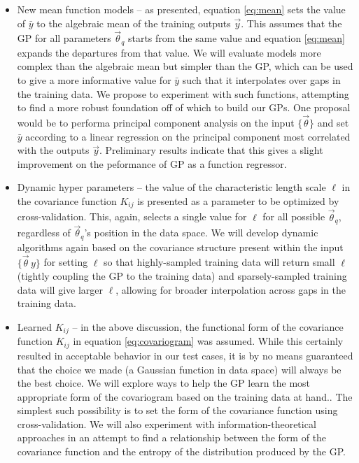 \documentclass[useAMS,usenatbib,tightenlines,11pt,preprint]{aastex}
\begin{document}
\begin{itemize}
\item New mean function models -- as presented,
equation \ref{eq:mean} sets the value of $\bar{y}$ to the algebraic mean of the
training outputs $\vec{y}$.  This assumes that the GP for all 
parameters $\vec{\theta}_q$
starts from the same value and equation \ref{eq:mean} expands the
departures from that value.  
We will evaluate models more complex than the algebraic
mean but simpler than the GP, which can be used to give a more informative value
for $\bar{y}$ such that it interpolates over gaps in the training data.  We propose
to experiment with such functions, attempting to find a more robust foundation off
of which to build our GPs.  One proposal would be to performa principal component
analysis on the input $\{\vec{\theta}\}$ and set $\bar{y}$ according to a linear
regression on the principal component most correlated with the outputs $\vec{y}$.
Preliminary results indicate that this gives a slight improvement on the peformance of
GP as a function regressor.

\item Dynamic hyper parameters -- the value of the characteristic
length scale $\ell$ in the covariance function $K_{ij}$ is presented
as a parameter to be optimized by cross-validation.  This, again, selects a
single value for $\ell$ for all possible $\vec{\theta}_q$, regardless of
$\vec{\theta}_q$'s position in the data space.  We will develop 
dynamic algorithms again based on the covariance
structure present within the input $\{\vec{\theta}\,y\}$  
for setting $\ell$ so that highly-sampled 
training data will
return small $\ell$ (tightly coupling the GP to the training data) and
sparsely-sampled training data will give larger $\ell$, allowing for broader
interpolation across gaps in the training data.

\item Learned $K_{ij}$ -- in the above discussion, the functional form of
the covariance function
$K_{ij}$ in equation \ref{eq:covariogram}
was assumed.  While this certainly resulted in acceptable behavior in
our test cases, it is by no means guaranteed that the choice we made (a Gaussian
function in data space) will always be the best choice.  We will explore ways
to help the GP learn the most appropriate form of 
the covariogram
based on the training data at hand..  The simplest such possibility is to set the 
form of the covariance function
using cross-validation.  We will also experiment with information-theoretical
approaches in an attempt to find a relationship between the form of the covariance
function and the entropy of the distribution produced by the GP.
\end{itemize}
\end{document}
